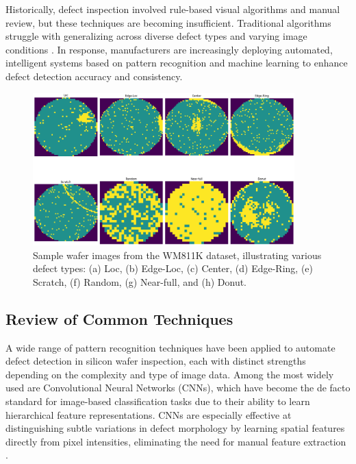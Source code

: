 \documentclass[conference]{IEEEtran}
\begin{document}
Historically, defect inspection involved rule-based visual algorithms and manual review, but these techniques are becoming insufficient. 
Traditional algorithms struggle with generalizing across diverse defect types and varying image conditions \cite{bg3}. 
In response, manufacturers are increasingly deploying automated, intelligent systems based on pattern recognition and machine learning to enhance defect detection accuracy and consistency. 

\begin{figure}[t]
    \centering
    \includegraphics[width=0.9\textwidth]{assets/sample_wafer_maps.png}
    \caption{Sample wafer images from the WM811K dataset, illustrating various defect types: (a) Loc, (b) Edge-Loc, (c) Center, (d) Edge-Ring, (e) Scratch, (f) Random, (g) Near-full, and (h) Donut.}
    \label{fig:sample-wafers}
\end{figure}

\subsection{Review of Common Techniques}
A wide range of pattern recognition techniques have been applied to automate defect detection in silicon wafer inspection, each with distinct strengths depending on the complexity and type of image data. 
Among the most widely used are Convolutional Neural Networks (CNNs), which have become the de facto standard for image-based classification tasks due to their ability to learn hierarchical feature representations. 
CNNs are especially effective at distinguishing subtle variations in defect morphology by learning spatial features directly from pixel intensities, eliminating the need for manual feature extraction \cite{bg4}. 
\end{document}
